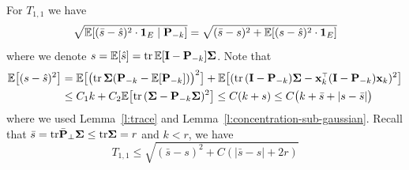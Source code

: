 \documentclass[thesis.tex]{subfiles}
\begin{document}
For $T_{1,1}$ we have
\[
  \sqrt{ \mathbb E [(\bar s-\hat s)^2 \cdot\mathbf 1_E \mid\mathbf P_{-k}] } = \sqrt{ (\bar s - s)^2 + \mathbb E[(s - \hat s)^2 \cdot\mathbf 1_E] }
\]
where we denote $s=\mathbb E[\hat s]=\mathrm{tr}\,\mathbb E[\mathbf I - \mathbf P_{-k}]\mathbf{\Sigma}$. Note that
\begin{align*}
  \E\big[(s - \hat s)^2 \big] &=
\E\big[\big(\tr\,\Sigmab(\P_{-k} - \E[\P_{-k}])\big)^2  \big] +
  \E\big[(\tr\,(\I - \P_{-k})\Sigmab-\x_k^\top(\I - \P_{-k})\x_k)^2  \big]\\
  &\leq C_1 k +  C_2 \E\big[\tr\,(\Sigmab - \P_{-k}\Sigmab)^2 \big] \le C(k+s)\leq C\big(k+\bar s + |s- \bar s| \big)
\end{align*}
where we used Lemma~\ref{l:trace} and Lemma~\ref{l:concentration-sub-gaussian}. Recall that $\bar s = \mathrm{tr} \bar {\mathbf P}_\perp \mathbf{\Sigma} \le \mathrm{tr} \mathbf{\Sigma} = r$ and $k < r$, we have
\begin{equation}\label{eq:bound-T11}
  T_{1,1} \le \sqrt{ (\bar s - s)^2 + C (|\bar s - s| + 2 r) }
\end{equation}

\end{document}
